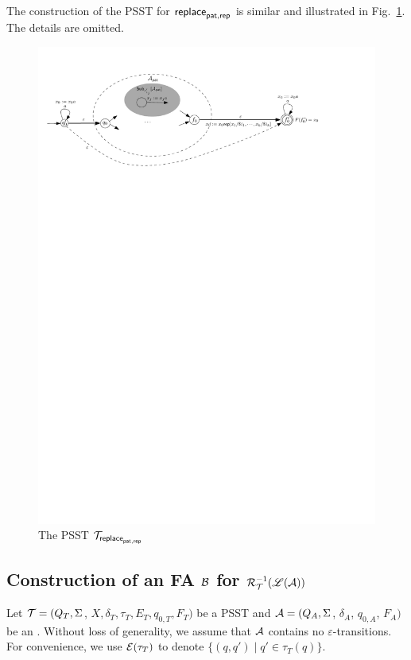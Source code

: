 The construction of the PSST for $\mathsf{replace}_{\mathsf{pat}, \mathsf{rep}}$ is similar and illustrated in Fig.~\ref{fig-psst-replace}. The details are omitted.
	\begin{figure}[ht]
		\centering
		\includegraphics[width=\textwidth]{psst-replace.pdf}
		\caption{The PSST $\mathcal{T}_{\mathsf{replace}_{\mathsf{pat},\mathsf{rep}}}$}
		\label{fig-psst-replace}
	\end{figure}
	

\subsection{Construction of an FA $\mathcal{B}$ for $\mathcal{R}^{-1}_{\mathcal{T}}(\mathscr{L}(\mathcal{A}))$}\label{app-pre-image}


Let $\mathcal{T} = (Q_T, \Sigma$, $X, \delta_T, \tau_T, E_T,  q_{0, T}, F_T)$ be a PSST  and $\mathcal{A}
  = (Q_A, \Sigma$, $\delta_A$, $q_{0, A}$, $F_A)$ be an \FA{}. Without loss of generality, we assume that $\mathcal{A}$ contains no $\varepsilon$-transitions. For convenience, we use $\mathcal{E}(\tau_T)$ to denote $\{(q, q') \mid q' \in \tau_T(q)\}$. 

